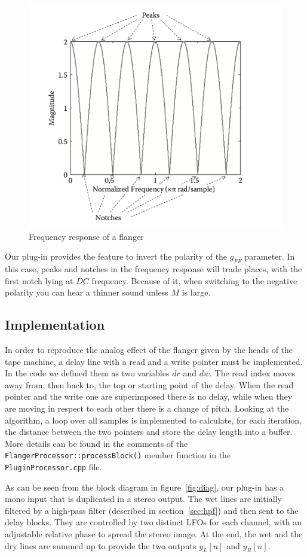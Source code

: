 \begin{figure}
	\centering
	\includegraphics[width=0.5\linewidth]{assets/comb.png}
	\caption{Frequency response of a flanger}
	\label{fig:comb}
\end{figure}

Our plug-in provides the feature to invert the polarity of the $g_{FF}$ parameter. In this case, peaks and notches in the frequency response will trade places, with the first notch lying at $DC$ frequency. Because of it, when switching to the negative polarity you can hear a thinner sound unless $M$ is large.

\subsection{Implementation}\label{sec:implementation}

In order to reproduce the analog effect of the flanger given by the heads of the tape machine, a delay line with a read and a write pointer must be implemented. In the code we defined them as two variables $dr$ and $dw$. The read index moves away from, then back to, the top or starting point of the delay. When the read pointer and the write one are superimposed there is no delay, while when they are moving in respect to each other there is a change of pitch. Looking at the algorithm, a loop over all samples is implemented to calculate, for each iteration, the distance between the two pointers and store the delay length into a buffer. More details can be found in the comments of the \texttt{FlangerProcessor::processBlock()} member function in the \texttt{PluginProcessor.cpp} file.

As can be seen from the block diagram in figure~\ref{fig:diag}, our plug-in has a mono input that is duplicated in a stereo output.
The wet lines are initially filtered by a high-pass filter (described in section~\ref{sec:hpf}) and then sent to the delay blocks. They are controlled by two distinct LFOs for each channel, with an adjustable relative phase to spread the stereo image. At the end, the wet and the dry lines are summed up to provide the two outputs $y_L[n]$ and $y_R[n]$.

